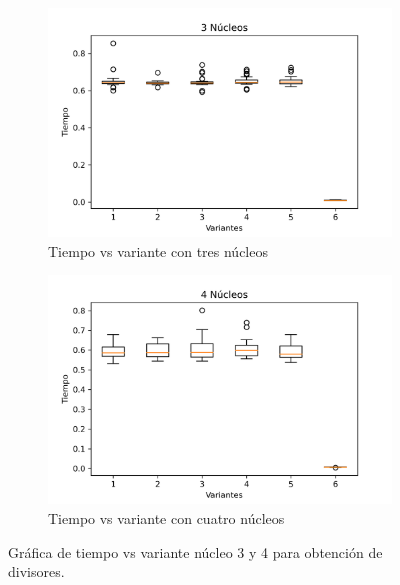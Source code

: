 \documentclass{article}
\begin{document}
\begin{figure}[H]
\centering
\begin{subfigure}[b]{0.45\linewidth}
\includegraphics[width=\linewidth]{Gráfica_3.png}
\caption{Tiempo vs variante con tres núcleos}
\end{subfigure}
\begin{subfigure}[b]{0.45\linewidth}
\includegraphics[width=\linewidth]{Gráfica_4.png}
\caption{Tiempo vs variante con cuatro núcleos}
\end{subfigure}
\caption{Gráfica de tiempo vs variante núcleo 3 y 4 para obtención de divisores.}
\label{fig:westminster}
\end{figure}
\end{document}
